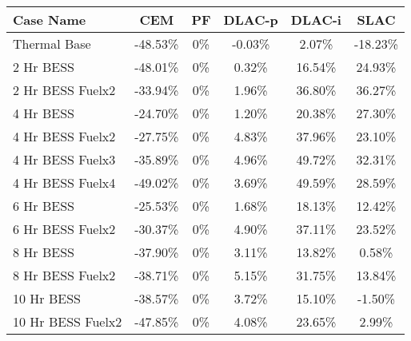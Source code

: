 \begin{tabular}{lccccc}
\toprule
Case Name & CEM & PF & DLAC-p & DLAC-i & SLAC \\
\midrule
Thermal Base & -48.53\% & 0\% & -0.03\% & 2.07\% & -18.23\% \\
2 Hr BESS & -48.01\% & 0\% & 0.32\% & 16.54\% & 24.93\% \\
2 Hr BESS Fuelx2 & -33.94\% & 0\% & 1.96\% & 36.80\% & 36.27\% \\
4 Hr BESS & -24.70\% & 0\% & 1.20\% & 20.38\% & 27.30\% \\
4 Hr BESS Fuelx2 & -27.75\% & 0\% & 4.83\% & 37.96\% & 23.10\% \\
4 Hr BESS Fuelx3 & -35.89\% & 0\% & 4.96\% & 49.72\% & 32.31\% \\
4 Hr BESS Fuelx4 & -49.02\% & 0\% & 3.69\% & 49.59\% & 28.59\% \\
6 Hr BESS & -25.53\% & 0\% & 1.68\% & 18.13\% & 12.42\% \\
6 Hr BESS Fuelx2 & -30.37\% & 0\% & 4.90\% & 37.11\% & 23.52\% \\
8 Hr BESS & -37.90\% & 0\% & 3.11\% & 13.82\% & 0.58\% \\
8 Hr BESS Fuelx2 & -38.71\% & 0\% & 5.15\% & 31.75\% & 13.84\% \\
10 Hr BESS & -38.57\% & 0\% & 3.72\% & 15.10\% & -1.50\% \\
10 Hr BESS Fuelx2 & -47.85\% & 0\% & 4.08\% & 23.65\% & 2.99\% \\
\bottomrule
\end{tabular}
